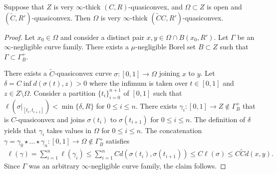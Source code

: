 \documentclass[10pt,a4paper]{amsart}
\begin{document}
\begin{lemma}\label{lem:thick-to-verythick}
Suppose that $Z$ is very $\infty$-thick $(C,R)$-quasiconvex, and $\Omega \subset Z$ is open and $( \widetilde{C}, R' )$-quasiconvex. Then $\Omega$ is very $\infty$-thick $( \widetilde{C}C, R' )$-quasiconvex.
\end{lemma}

\begin{proof}
Let $x_0 \in \Omega$ and consider a distinct pair $x, y \in \Omega \cap B( x_0, R' )$. Let $\Gamma$ be an $\infty$-negligible curve family. There exists a $\mu$-negligible Borel set $B \subset Z$ such that $\Gamma \subset \Gamma^{+}_{B}$.

There exists a $\widetilde{C}$-quasiconvex curve $\sigma \colon [0,1] \rightarrow \Omega$ joining $x$ to $y$. Let $\delta = C \inf d( \sigma(t), z ) > 0$ where the infimum is taken over $t \in [0,1]$ and $z \in Z \setminus \Omega$. Consider a partition $\{ t_i \}_{ i = 0 }^{ n+1 }$ of $[0,1]$ such that $\ell( \sigma|_{ [t_i, t_{i+1}] } ) < \min\{ \delta, R \}$ for $0 \leq i \leq n$. There exists $\gamma_i \colon [0,1] \rightarrow Z \not\in \Gamma^{+}_{B}$ that is $C$-quasiconvex and joins $\sigma( t_i )$ to $\sigma( t_{i+1} )$ for $0 \leq i \leq n$. The definition of $\delta$ yields that $\gamma_i$ takes values in $\Omega$ for $0 \leq i \leq n$. The concatenation $\gamma = \gamma_0 \star \dots \star \gamma_{n} \colon [0,1] \rightarrow \Omega \not\in \Gamma^{+}_{B}$ satisfies
\begin{align*}
    \ell( \gamma )
    =
    \sum_{ i = 1 }^{ n } \ell( \gamma_i )
    \leq
    \sum_{ i = 1 }^{ n } C d( \sigma( t_i ), \sigma( t_{i+1} ) )
    \leq
    C \ell( \sigma )
    \leq
    C \widetilde{C} d( x, y ).
\end{align*}
Since $\Gamma$ was an arbitrary $\infty$-negligible curve family, the claim follows.
\end{proof}
\end{document}
